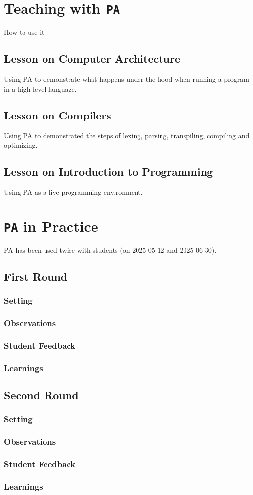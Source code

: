 
\chapter{Teaching with \texttt{PA}} \label{ch_teaching}
How to use it

\section{Lesson on Computer Architecture}
Using PA to demonstrate what happens under the hood when running a program in a high level language.

\section{Lesson on Compilers}
Using PA to demonstrated the steps of lexing, parsing, transpiling, compiling and optimizing.

\section{Lesson on Introduction to Programming}
Using PA as a live programming environment.

\chapter{\texttt{PA} in Practice} \label{ch_practice}
PA has been used twice with students (on 2025-05-12 and 2025-06-30).

\section{First Round}
\subsection{Setting}
\subsection{Observations}
\subsection{Student Feedback}
\subsection{Learnings}

\section{Second Round}
\subsection{Setting}
\subsection{Observations}
\subsection{Student Feedback}
\subsection{Learnings}
